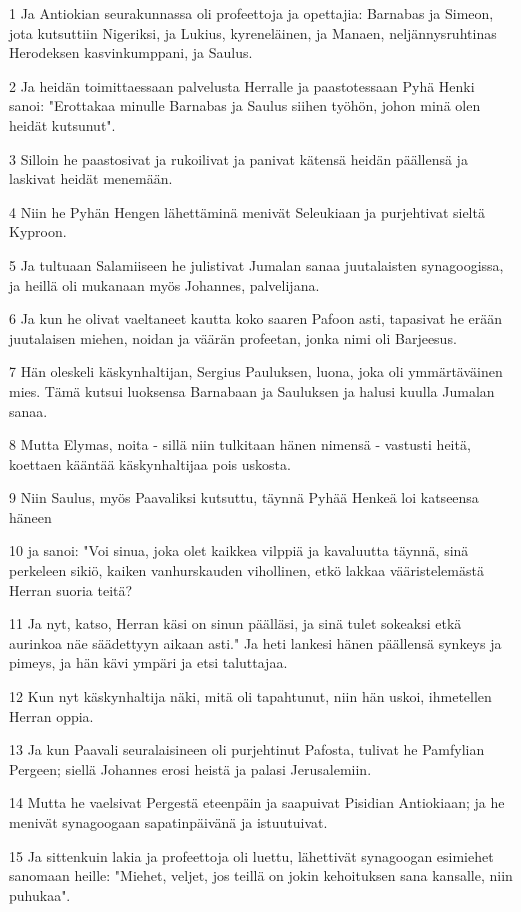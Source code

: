\par 1 Ja Antiokian seurakunnassa oli profeettoja ja opettajia: Barnabas ja Simeon, jota kutsuttiin Nigeriksi, ja Lukius, kyreneläinen, ja Manaen, neljännysruhtinas Herodeksen kasvinkumppani, ja Saulus.
\par 2 Ja heidän toimittaessaan palvelusta Herralle ja paastotessaan Pyhä Henki sanoi: "Erottakaa minulle Barnabas ja Saulus siihen työhön, johon minä olen heidät kutsunut".
\par 3 Silloin he paastosivat ja rukoilivat ja panivat kätensä heidän päällensä ja laskivat heidät menemään.
\par 4 Niin he Pyhän Hengen lähettäminä menivät Seleukiaan ja purjehtivat sieltä Kyproon.
\par 5 Ja tultuaan Salamiiseen he julistivat Jumalan sanaa juutalaisten synagoogissa, ja heillä oli mukanaan myös Johannes, palvelijana.
\par 6 Ja kun he olivat vaeltaneet kautta koko saaren Pafoon asti, tapasivat he erään juutalaisen miehen, noidan ja väärän profeetan, jonka nimi oli Barjeesus.
\par 7 Hän oleskeli käskynhaltijan, Sergius Pauluksen, luona, joka oli ymmärtäväinen mies. Tämä kutsui luoksensa Barnabaan ja Sauluksen ja halusi kuulla Jumalan sanaa.
\par 8 Mutta Elymas, noita - sillä niin tulkitaan hänen nimensä - vastusti heitä, koettaen kääntää käskynhaltijaa pois uskosta.
\par 9 Niin Saulus, myös Paavaliksi kutsuttu, täynnä Pyhää Henkeä loi katseensa häneen
\par 10 ja sanoi: "Voi sinua, joka olet kaikkea vilppiä ja kavaluutta täynnä, sinä perkeleen sikiö, kaiken vanhurskauden vihollinen, etkö lakkaa vääristelemästä Herran suoria teitä?
\par 11 Ja nyt, katso, Herran käsi on sinun päälläsi, ja sinä tulet sokeaksi etkä aurinkoa näe säädettyyn aikaan asti." Ja heti lankesi hänen päällensä synkeys ja pimeys, ja hän kävi ympäri ja etsi taluttajaa.
\par 12 Kun nyt käskynhaltija näki, mitä oli tapahtunut, niin hän uskoi, ihmetellen Herran oppia.
\par 13 Ja kun Paavali seuralaisineen oli purjehtinut Pafosta, tulivat he Pamfylian Pergeen; siellä Johannes erosi heistä ja palasi Jerusalemiin.
\par 14 Mutta he vaelsivat Pergestä eteenpäin ja saapuivat Pisidian Antiokiaan; ja he menivät synagoogaan sapatinpäivänä ja istuutuivat.
\par 15 Ja sittenkuin lakia ja profeettoja oli luettu, lähettivät synagoogan esimiehet sanomaan heille: "Miehet, veljet, jos teillä on jokin kehoituksen sana kansalle, niin puhukaa".
